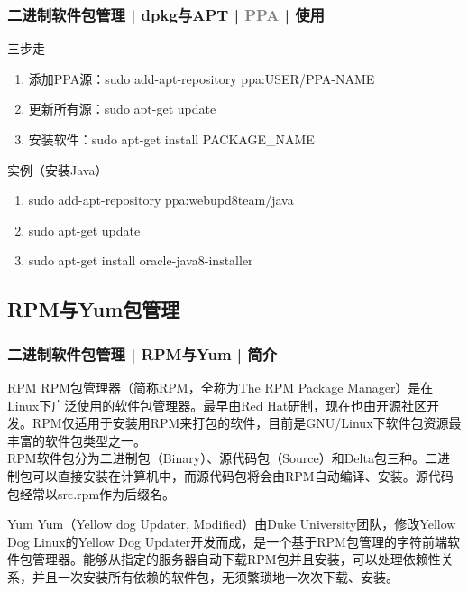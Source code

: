 \begin{frame}
  \frametitle{二进制软件包管理 | dpkg与APT | \textcolor{gray}{PPA} | 使用}
  \begin{block}{三步走}
    \begin{enumerate}
      \item 添加PPA源：sudo add-apt-repository ppa:USER/PPA-NAME
      \item 更新所有源：sudo apt-get update
      \item 安装软件：sudo apt-get install PACKAGE\_NAME
    \end{enumerate}
  \end{block}
  \pause
  \begin{block}{实例（安装Java）}
    \begin{enumerate}
      \item sudo add-apt-repository ppa:webupd8team/java
      \item sudo apt-get update
      \item sudo apt-get install oracle-java8-installer
    \end{enumerate}
  \end{block}
\end{frame}

\subsection{RPM与Yum包管理}
\begin{frame}
  \frametitle{二进制软件包管理 | RPM与Yum | 简介}
  \begin{block}{RPM}
    RPM包管理器（简称RPM，全称为The RPM Package Manager）是在Linux下广泛使用的软件包管理器。最早由Red Hat研制，现在也由开源社区开发。RPM仅适用于安装用RPM来打包的软件，目前是GNU/Linux下软件包资源最丰富的软件包类型之一。\\
    RPM软件包分为二进制包（Binary）、源代码包（Source）和Delta包三种。二进制包可以直接安装在计算机中，而源代码包将会由RPM自动编译、安装。源代码包经常以src.rpm作为后缀名。
  \end{block}
  \pause
  \begin{block}{Yum}
    Yum（Yellow dog Updater, Modified）由Duke University团队，修改Yellow Dog Linux的Yellow Dog Updater开发而成，是一个基于RPM包管理的字符前端软件包管理器。能够从指定的服务器自动下载RPM包并且安装，可以处理依赖性关系，并且一次安装所有依赖的软件包，无须繁琐地一次次下载、安装。
  \end{block}
\end{frame}

